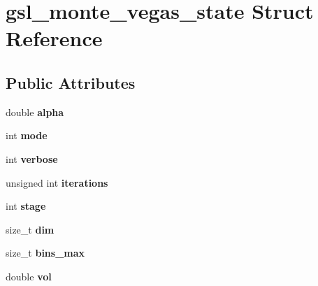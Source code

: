 \hypertarget{structgsl__monte__vegas__state}{\section{gsl\-\_\-monte\-\_\-vegas\-\_\-state Struct Reference}
\label{structgsl__monte__vegas__state}
}
\subsection*{Public Attributes}
\begin{DoxyCompactItemize}
\item 
\hypertarget{structgsl__monte__vegas__state_ac4ec6963d05518e01d01d76a7abf2d72}{double {\bfseries alpha}}\label{structgsl__monte__vegas__state_ac4ec6963d05518e01d01d76a7abf2d72}

\item 
\hypertarget{structgsl__monte__vegas__state_abfd4b81fd3e56b534200f519c6328983}{int {\bfseries mode}}\label{structgsl__monte__vegas__state_abfd4b81fd3e56b534200f519c6328983}

\item 
\hypertarget{structgsl__monte__vegas__state_a3b231c18a17bd6308a13dccfdc127640}{int {\bfseries verbose}}\label{structgsl__monte__vegas__state_a3b231c18a17bd6308a13dccfdc127640}

\item 
\hypertarget{structgsl__monte__vegas__state_ab70b32ef2f830b42102cdb90d6c43559}{unsigned int {\bfseries iterations}}\label{structgsl__monte__vegas__state_ab70b32ef2f830b42102cdb90d6c43559}

\item 
\hypertarget{structgsl__monte__vegas__state_a2cc9b903c080a51f3a60a4df6535599f}{int {\bfseries stage}}\label{structgsl__monte__vegas__state_a2cc9b903c080a51f3a60a4df6535599f}

\item 
\hypertarget{structgsl__monte__vegas__state_a23def5ffb0e0dd8bf8da84f843e67c20}{size\-\_\-t {\bfseries dim}}\label{structgsl__monte__vegas__state_a23def5ffb0e0dd8bf8da84f843e67c20}

\item 
\hypertarget{structgsl__monte__vegas__state_a5f04c54af2d6541a44119b41d188500b}{size\-\_\-t {\bfseries bins\-\_\-max}}\label{structgsl__monte__vegas__state_a5f04c54af2d6541a44119b41d188500b}

\item 
\hypertarget{structgsl__monte__vegas__state_a77ec767e5e8c02429a1f67e4624aad37}{double {\bfseries vol}}\label{structgsl__monte__vegas__state_a77ec767e5e8c02429a1f67e4624aad37}


\end{DoxyCompactItemize}
